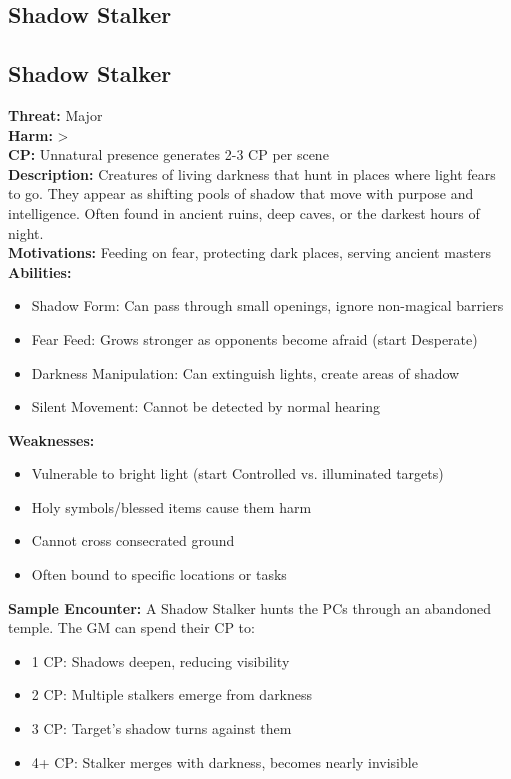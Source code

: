 \documentclass[11pt]{article}
\newenvironment{monsterentry}[1]{%
  \begin{mdframed}[backgroundcolor=shadecolor, linewidth=0pt, leftmargin=0pt, rightmargin=0pt]%
  \subsection*{#1}%
}{%
  \end{mdframed}%
}
\begin{document}
\subsection{Shadow Stalker}

\begin{monsterentry}{Shadow Stalker}
\textbf{Threat:} Major \\
\textbf{Harm:} \textgreater \\
\textbf{CP:} Unnatural presence generates 2-3 CP per scene \\
\textbf{Description:} Creatures of living darkness that hunt in places where light fears to go. They appear as shifting pools of shadow that move with purpose and intelligence. Often found in ancient ruins, deep caves, or the darkest hours of night. \\
\textbf{Motivations:} Feeding on fear, protecting dark places, serving ancient masters \\
\textbf{Abilities:}
\begin{itemize}
    \item Shadow Form: Can pass through small openings, ignore non-magical barriers
    \item Fear Feed: Grows stronger as opponents become afraid (start Desperate)
    \item Darkness Manipulation: Can extinguish lights, create areas of shadow
    \item Silent Movement: Cannot be detected by normal hearing
\end{itemize}
\textbf{Weaknesses:}
\begin{itemize}
    \item Vulnerable to bright light (start Controlled vs. illuminated targets)
    \item Holy symbols/blessed items cause them harm
    \item Cannot cross consecrated ground
    \item Often bound to specific locations or tasks
\end{itemize}
\textbf{Sample Encounter:} A Shadow Stalker hunts the PCs through an abandoned temple. The GM can spend their CP to:
\begin{itemize}
    \item 1 CP: Shadows deepen, reducing visibility
    \item 2 CP: Multiple stalkers emerge from darkness
    \item 3 CP: Target's shadow turns against them
    \item 4+ CP: Stalker merges with darkness, becomes nearly invisible
\end{itemize}
\end{monsterentry}
\end{document}
